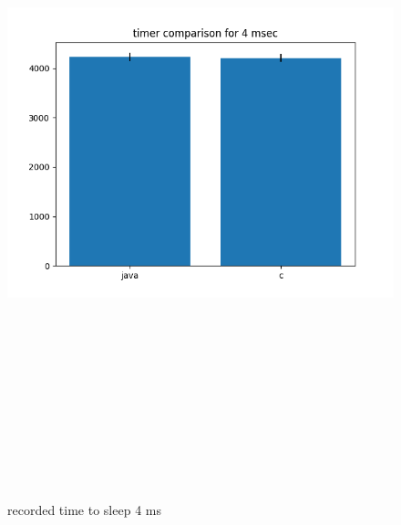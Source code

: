 \documentclass{article}
\begin{document}
    \begin{figure}[H]
    	\centering
    	\includegraphics[width=17cm,height=20cm,keepaspectratio]{AsyncMonitorCompares/sleep-timer_java-vs-c/time-compare-4.png}
    	\caption{recorded time to sleep 4 ms}
    	\label{fig:xalan-fix-PKG}
    \end{figure}
\end{document}
